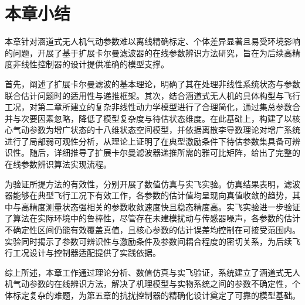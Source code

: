 \section{本章小结}%
本章针对涵道式无人机气动参数难以离线精确标定、个体差异显著且易受环境影响的问题，开展了基于扩展卡尔曼滤波器的在线参数辨识方法研究，旨在为后续高精度非线性控制器的设计提供准确的模型支撑。

首先，阐述了扩展卡尔曼滤波的基本理论，明确了其在处理非线性系统状态与参数联合估计问题时的适用性与递推框架。其次，结合涵道式无人机的具体构型与飞行工况，对第二章所建立的复杂非线性动力学模型进行了合理简化，通过集总参数合并与次要因素忽略，降低了模型复杂度与待估状态维度。在此基础上，构建了以核心气动参数为增广状态的十八维状态空间模型，并依据离散李导数理论对增广系统进行了局部弱可观性分析，从理论上证明了在典型激励条件下待估参数集具备可辨识性。随后，详细推导了扩展卡尔曼滤波器递推所需的雅可比矩阵，给出了完整的在线参数辨识算法实现流程。

为验证所提方法的有效性，分别开展了数值仿真与实飞实验。仿真结果表明，滤波器能够在典型飞行工况下有效工作，各参数的估计值均呈现向真值收敛的趋势，其中与高精度测量状态强相关的参数收敛速度快且稳态精度高。实飞实验进一步验证了算法在实际环境中的鲁棒性，尽管存在未建模扰动与传感器噪声，各参数的估计不确定性区间仍能有效覆盖真值，且核心参数的估计误差均控制在可接受范围内。实验同时揭示了参数可辨识性与激励条件及参数间耦合程度的密切关系，为后续飞行工况设计与控制器适配提供了实践依据。

综上所述，本章工作通过理论分析、数值仿真与实飞验证，系统建立了涵道式无人机气动参数的在线辨识方法，解决了机理模型与实物系统之间的参数不确定性，个体标定复杂的难题，为第五章的抗扰控制器的精确化设计奠定了可靠的模型基础。